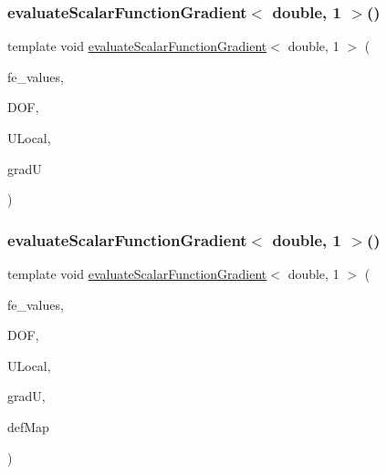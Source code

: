 \mbox{\label{function_evaluations_8cc_a778e8b0e56686ca05b7ae735ede7547d}} 
\subsubsection{\texorpdfstring{evaluateScalarFunctionGradient$<$ double, 1 $>$()}{evaluateScalarFunctionGradient< double, 1 >()}\hspace{0.1cm}{\footnotesize\ttfamily [1/4]}}
{\footnotesize\ttfamily template void \mbox{\hyperlink{group___evaluation_functions_gabedd4ae2841d2332ed0df0513b189e34}{evaluate\+Scalar\+Function\+Gradient}}$<$ double, 1 $>$ (\begin{DoxyParamCaption}\item[{const F\+E\+Values$<$ 1 $>$ \&}]{fe\+\_\+values,  }\item[{unsigned int}]{D\+OF,  }\item[{Table$<$ 1, double $>$ \&}]{U\+Local,  }\item[{Table$<$ 2, double $>$ \&}]{gradU }\end{DoxyParamCaption})}

\mbox{\label{function_evaluations_8cc_a3cc57fd0ac6ea503b820934671353e6f}} 
\subsubsection{\texorpdfstring{evaluateScalarFunctionGradient$<$ double, 1 $>$()}{evaluateScalarFunctionGradient< double, 1 >()}\hspace{0.1cm}{\footnotesize\ttfamily [2/4]}}
{\footnotesize\ttfamily template void \mbox{\hyperlink{group___evaluation_functions_gabedd4ae2841d2332ed0df0513b189e34}{evaluate\+Scalar\+Function\+Gradient}}$<$ double, 1 $>$ (\begin{DoxyParamCaption}\item[{const F\+E\+Values$<$ 1 $>$ \&}]{fe\+\_\+values,  }\item[{unsigned int}]{D\+OF,  }\item[{Table$<$ 1, double $>$ \&}]{U\+Local,  }\item[{Table$<$ 2, double $>$ \&}]{gradU,  }\item[{\mbox{\hyperlink{structdeformation_map}{deformation\+Map}}$<$ double, 1 $>$ \&}]{def\+Map }\end{DoxyParamCaption})}

